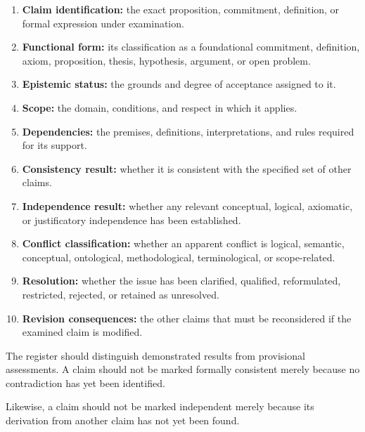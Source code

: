 \begin{enumerate}
    \item \textbf{Claim identification:} the exact proposition,
    commitment, definition, or formal expression under
    examination.

    \item \textbf{Functional form:} its classification as
    a foundational commitment, definition, axiom,
    proposition, thesis, hypothesis, argument, or
    open problem.

    \item \textbf{Epistemic status:} the grounds and
    degree of acceptance assigned to it.

    \item \textbf{Scope:} the domain, conditions, and
    respect in which it applies.

    \item \textbf{Dependencies:} the premises, definitions,
    interpretations, and rules required for its support.

    \item \textbf{Consistency result:} whether it is
    consistent with the specified set of other claims.

    \item \textbf{Independence result:} whether any
    relevant conceptual, logical, axiomatic, or
    justificatory independence has been established.

    \item \textbf{Conflict classification:} whether an
    apparent conflict is logical, semantic, conceptual,
    ontological, methodological, terminological, or
    scope-related.

    \item \textbf{Resolution:} whether the issue has
    been clarified, qualified, reformulated, restricted,
    rejected, or retained as unresolved.

    \item \textbf{Revision consequences:} the other
    claims that must be reconsidered if the examined
    claim is modified.
\end{enumerate}

The register should distinguish demonstrated results
from provisional assessments. A claim should not be
marked formally consistent merely because no
contradiction has yet been identified.

Likewise, a claim should not be marked independent
merely because its derivation from another claim has
not yet been found.

